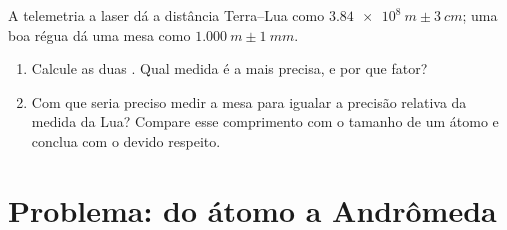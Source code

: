 \begin{exercise}[$\star\star\star$]\label{exo:g10:orders-of-magnitude:15}
A telemetria a laser dá a distância Terra--Lua como
$\qty{3.84e8}{m} \pm \qty{3}{cm}$; uma boa régua dá uma mesa como
$\qty{1.000}{m} \pm \qty{1}{mm}$.
\begin{enumerate}
  \item Calcule as duas . Qual medida é a mais
        precisa, e por que fator?
  \item Com que  seria preciso medir a mesa para
        igualar a precisão relativa da medida da Lua? Compare esse
        comprimento com o tamanho de um átomo e conclua com o devido
        respeito.
\end{enumerate}
\end{exercise}

\section{Problema: do átomo a Andrômeda}


